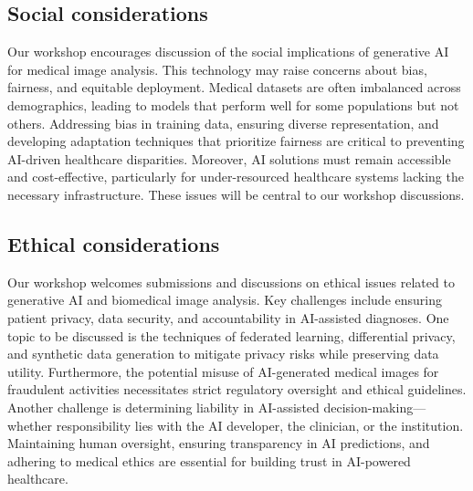 \documentclass{article}
\def\c#1{\textcolor{gray}{#1}}
\begin{document}
\subsection{Social considerations}

Our workshop encourages discussion of the social implications of generative AI for medical image analysis. %
This technology may raise concerns about bias, fairness, and equitable deployment. Medical datasets are often imbalanced across demographics, leading to models that perform well for some populations but not others. Addressing bias in training data, ensuring diverse representation, and developing adaptation techniques that prioritize fairness are critical to preventing AI-driven healthcare disparities. Moreover, AI solutions must remain accessible and cost-effective, particularly for under-resourced healthcare systems lacking the necessary infrastructure. These issues will be central to our workshop discussions.

\subsection{Ethical considerations}
Our workshop welcomes submissions and discussions on ethical issues related to generative AI and biomedical image analysis. Key challenges include ensuring patient privacy, data security, and accountability in AI-assisted diagnoses. One topic to be discussed is the techniques of federated learning, differential privacy, and synthetic data generation to mitigate privacy risks while preserving data utility. %
Furthermore, the potential misuse of AI-generated medical images for fraudulent activities necessitates strict regulatory oversight and ethical guidelines. Another challenge is determining liability in AI-assisted decision-making—whether responsibility lies with the AI developer, the clinician, or the institution. Maintaining human oversight, ensuring transparency in AI predictions, and adhering to medical ethics are essential for building trust in AI-powered healthcare.
\end{document}

